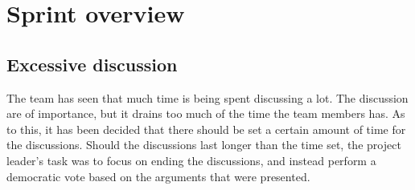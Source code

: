 \section{Sprint overview}


\subsection{Excessive discussion}
The team has seen that much time is being spent discussing a lot. The discussion are of importance, but it drains too much of the time the team members has. As to this, it has been decided that there should be set a certain amount of time for the discussions. Should the discussions last longer than the time set, the project leader's task was to focus on ending the discussions, and instead perform a democratic vote based on the arguments that were presented. 
